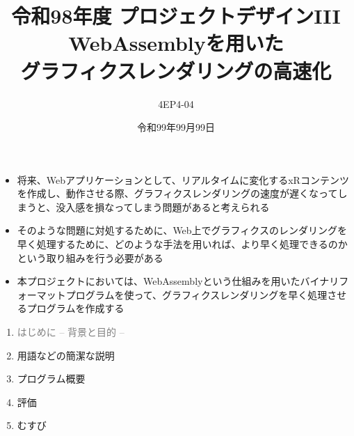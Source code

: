 % 
%

\title{
{\normalsize 令和98年度 プロジェクトデザインIII}\\\vspace{10mm}
{\LARGE WebAssemblyを用いた\\グラフィクスレンダリングの高速化}
}
\date{令和99年99月99日}
\author{
4EP4-04\\ 
}




\maketitle %
\addtocounter{page}{1}
\thispagestyle{myfirstpage}

\begin{itemize}
 \item 将来、Webアプリケーションとして、リアルタイムに変化するxRコンテンツを作成し、動作させる際、グラフィクスレンダリングの速度が遅くなってしまうと、没入感を損なってしまう問題があると考えられる
 \item そのような問題に対処するために、Web上でグラフィクスのレンダリングを早く処理するために、どのような手法を用いれば、より早く処理できるのかという取り組みを行う必要がある
 \item 本プロジェクトにおいては、WebAssemblyという仕組みを用いたバイナリフォーマットプログラムを使って、グラフィクスレンダリングを早く処理させるプログラムを作成する
\end{itemize}
\newpage

\begin{enumerate}[itemsep=0.25\zh]
	\item \textcolor{gray}{はじめに -- 背景と目的 --}
	\item 用語などの簡潔な説明
	\item プログラム概要
	\item 評価
	\item むすび
\end{enumerate}
\newpage

